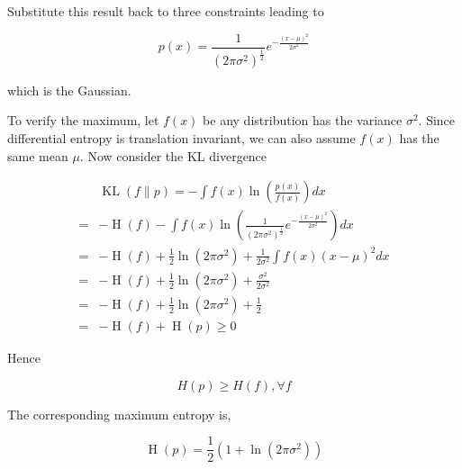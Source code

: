 \documentclass{article}
\begin{document}
            Substitute this result back to three constraints leading to

            \begin{equation*}
                 p(x) = \frac{1}{ (2 \pi \sigma^2)^{\frac{1}{2}} } e^{ -\frac{(x - \mu)^2}{2 \sigma^2} }
            \end{equation*}

            which is the Gaussian.

            To verify the maximum, let $ f(x) $ be any distribution has the
            variance $ \sigma^2 $. Since differential entropy is translation invariant, we can also assume
            $ f(x) $ has the same mean $ \mu $. Now consider the KL divergence

            \begin{align*}
                & \operatorname{KL}(f \| p) = -\int f(x) \ln \left( \frac{p(x)}{f(x)} \right) dx \\
                =& -\operatorname{H}(f) - \int f(x) \ln \left(
                     \frac{1}{ (2 \pi
                     \sigma^2)^{\frac{1}{2}} } e^{
                 -\frac{(x - \mu)^2}{2 \sigma^2} } 
                \right) dx \\
                =& -\operatorname{H}(f) + \frac{1}{2} \ln (2 \pi \sigma^{2}) +
                \frac{1}{2 \sigma^{2}} \int f(x) (x - \mu)^{2} dx \\
                =& -\operatorname{H}(f) + \frac{1}{2} \ln (2 \pi \sigma^{2}) + \frac{\sigma^{2}}{2 \sigma^{2}} \\
                =& -\operatorname{H}(f) + \frac{1}{2} \ln (2 \pi \sigma^{2}) + \frac{1}{2} \\
                =& -\operatorname{H}(f) + \operatorname{H}(p) \geq 0
            \end{align*}

            Hence

            \begin{equation*}
                 H(p) \geq H(f), \forall f
            \end{equation*}

            The corresponding maximum entropy is,

            \begin{equation*}
                 \operatorname{H}(p) = \frac{1}{2} (1 + \ln(2 \pi \sigma^2))
            \end{equation*}
\end{document}
